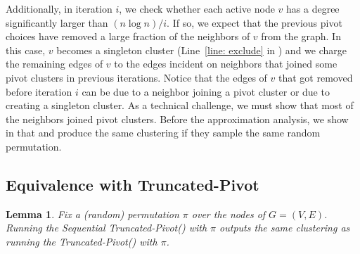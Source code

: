 \documentclass[10pt,a4paper]{article}
\newtheorem{lemma}{Lemma}[section]
\newcommand{\seqtruncatedpivot}{Sequential \textrm{Truncated-Pivot}\xspace}
\newcommand{\truncatedpivot}{\textrm{Truncated-Pivot}\xspace}
\begin{document}
Additionally, in iteration $i$, we check whether each active node $v$ has a degree significantly larger than $(n \log n)/i$.
If so, we expect that the previous pivot choices have removed a large fraction of the neighbors of $v$ from the graph.
In this case, $v$ becomes a singleton cluster (Line~\ref{line: exclude} in ) and we charge the remaining edges of $v$ to the edges incident on neighbors that joined some pivot clusters in previous iterations.
Notice that the edges of $v$ that got removed before iteration $i$ can be due to a neighbor joining a pivot cluster or due to creating a singleton cluster.
As a technical challenge, we must show that most of the neighbors joined pivot clusters. 
Before the approximation analysis, we show in  that  and  produce the same clustering if they sample the same random permutation.

\subsection{Equivalence with \truncatedpivot}


\begin{lemma} \label{lemma: seqvsparallel}
    Fix a (random) permutation $\pi$ over the nodes of $G = (V, E)$.
    Running the \seqtruncatedpivot () with $\pi$ outputs the same clustering as running the \truncatedpivot () with $\pi$.
\end{lemma}
\end{document}
